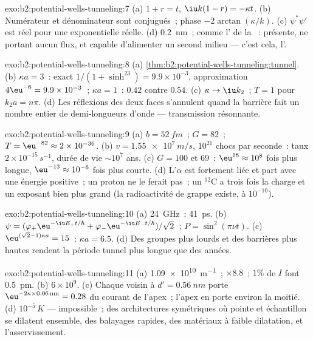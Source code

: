 \begin{solution}{exo:b2:potential-wells-tunneling:7}
(a) $1 + r = t$, $\iu k(1 - r) = -\kappa t$. (b) Numérateur et dénominateur
sont conjugués~; phase $-2\arctan(\kappa/k)$. (c) $\psi^*\psi'$ est réel pour une
exponentielle réelle. (d) \qty{0.2}{nm}~; comme l' de la ~: présente, ne portant aucun flux, et capable d'alimenter un second milieu
--- c'est cela, l'.
\end{solution}

\begin{solution}{exo:b2:potential-wells-tunneling:8}
(a) \cref{thm:b2:potential-wells-tunneling:tunnel}. (b) $\kappa a = 3$~:
exact $1/(1 + \sinh^23) = 9.9 \times 10^{-3}$, approximation $4\eu^{-6} = 9.9 \times
10^{-3}$~; $\kappa a = 1$~: $0.42$ contre $0.54$. (c) $\kappa \to \iu k_2$~; $T = 1$
pour $k_2a = n\pi$. (d) Les réflexions des deux faces s'annulent quand la
barrière fait un nombre entier de demi-longueurs d'onde --- transmission
résonnante.
\end{solution}

\begin{solution}{exo:b2:potential-wells-tunneling:9}
(a) $b = \qty{52}{fm}$~; $G = 82$~; $T = \eu^{-82} \approx 2 \times 10^{-36}$. (b) $v =
\qty{1.55e7}{m/s}$, $10^{21}$ chocs par seconde~: taux $2 \times 10^{-15}\,\unit{s^{-1}}$,
durée de vie $\sim 10^7$ ans. (c) $G = 100$ et $69$~: $\eu^{18} \approx 10^8$ fois plus longue,
$\eu^{-13} \approx 10^{-6}$ fois plus courte. (d) L'$\alpha$ est fortement liée et part
avec une énergie positive~; un proton ne le ferait pas~; un $^{12}$C a trois fois la
charge et un exposant bien plus grand (la radioactivité de grappe existe, à $10^{-10}$).
\end{solution}

\begin{solution}{exo:b2:potential-wells-tunneling:10}
(a) \qty{24}{GHz}~; \qty{41}{ps}. (b) $\psi = (\varphi_+\eu^{-\iu E_+t/\hbar} +
\varphi_-\eu^{-\iu E_-t/\hbar})/\sqrt2$~; $P = \sin^2(\pi\nu t)$. (c) $\eu^{(\sqrt2 - 1)
\kappa a} = 15$~: $\kappa a = 6.5$. (d) Des groupes plus lourds et des barrières plus hautes rendent
la période tunnel plus longue que des années.
\end{solution}

\begin{solution}{exo:b2:potential-wells-tunneling:11}
(a) \qty{1.09e10}{m^{-1}}~; $\times 8.8$~; $1\%$ de $I$ font \qty{0.5}{pm}. (b) $6 \times 10^9$.
(c) Chaque voisin à $d' = \qty{0.56}{nm}$ porte $\eu^{-2\kappa \times 0.06\,\text{nm}}
= 0.28$ du courant de l'apex~; l'apex en porte environ la moitié. (d)
$10^{-5}\,\unit{K}$ --- impossible~; des architectures symétriques où pointe et échantillon
se dilatent ensemble, des balayages rapides, des matériaux à faible dilatation, et l'asservissement.
\end{solution}

